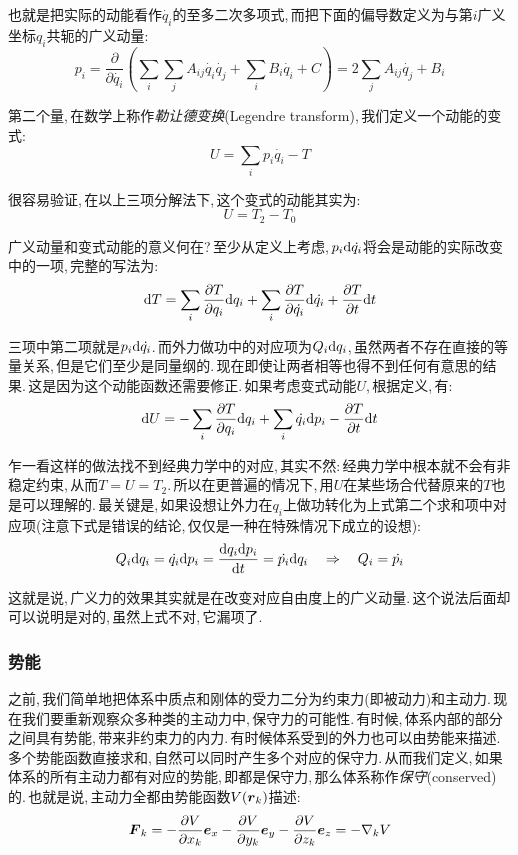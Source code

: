 也就是把实际的动能看作$\dot{q_i}$的至多二次多项式,\,而把下面的偏导数定义为与第$i$广义坐标$q_i$共轭的广义动量:
\[p_i=\frac{\partial}{\partial \dot{q_i}}\left(\sum_i\sum_j A_{ij}\dot{q_i}\dot{q_j}+\sum_i B_i \dot{q_i}+C\right)=2\sum_j A_{ij}\dot{q_j}+B_i\]

第二个量,\,在数学上称作\emph{勒让德变换}(Legendre transform),\,我们定义一个动能的变式:
\[U=\sum_i p_i\dot{q_i}-T\]

很容易验证,\,在以上三项分解法下,\,这个变式的动能其实为:
\[U=T_2-T_0\]

广义动量和变式动能的意义何在?\,至少从定义上考虑,\,$p_i\textrm{d} \dot{q_i}$将会是动能的实际改变中的一项,\,完整的写法为:
\[\textrm{d} T=\sum_i \frac{\partial T}{\partial q_i}\textrm{d} q_i+\sum_i \frac{\partial T}{\partial \dot{q_i}}\textrm{d} \dot{q_i}+\frac{\partial T}{\partial t}\textrm{d} t\]

三项中第二项就是$p_i\textrm{d} \dot{q_i}$.\,而外力做功中的对应项为$Q_i\textrm{d} q_i$,\,虽然两者不存在直接的等量关系,\,但是它们至少是同量纲的.\,现在即使让两者相等也得不到任何有意思的结果.\,这是因为这个动能函数还需要修正.\,如果考虑变式动能$U$,\,根据定义,\,有:
\[\textrm{d} U=-\sum_i \frac{\partial T}{\partial q_i}\textrm{d} q_i+\sum_i \dot{q_i}\textrm{d} p_i-\frac{\partial T}{\partial t}\textrm{d} t\]

乍一看这样的做法找不到经典力学中的对应,\,其实不然:\,经典力学中根本就不会有非稳定约束,\,从而$T=U=T_2$.\,所以在更普遍的情况下,\,用$U$在某些场合代替原来的$T$也是可以理解的.\,最关键是,\,如果设想让外力在$q_i$上做功转化为上式第二个求和项中对应项(注意下式是错误的结论,\,仅仅是一种在特殊情况下成立的设想):
\[Q_i\textrm{d} q_i=\dot{q_i}\textrm{d} p_i=\frac{\textrm{d} q_i \textrm{d} p_i}{\textrm{d} t}=\dot{p_i}\textrm{d} q_i\quad\Rightarrow\quad Q_i=\dot{p_i}\]

这就是说,\,广义力的效果其实就是在改变对应自由度上的广义动量.\,这个说法后面却可以说明是对的,\,虽然上式不对,\,它漏项了.

\subsubsection{势能}

之前,\,我们简单地把体系中质点和刚体的受力二分为约束力(即被动力)和主动力.\,现在我们要重新观察众多种类的主动力中,\,保守力的可能性.\,有时候,\,体系内部的部分之间具有势能,\,带来非约束力的内力.\,有时候体系受到的外力也可以由势能来描述.\,多个势能函数直接求和,\,自然可以同时产生多个对应的保守力.\,从而我们定义,\,如果体系的所有主动力都有对应的势能,\,即都是保守力,\,那么体系称作\emph{保守}(conserved)的.\,也就是说,\,主动力全都由势能函数$V(\boldsymbol{r}_k)$描述:
\[\boldsymbol{F}_k=-\frac{\partial V}{\partial x_k}\boldsymbol{e}_x-\frac{\partial V}{\partial y_k}\boldsymbol{e}_y-\frac{\partial V}{\partial z_k}\boldsymbol{e}_z=-\nabla_k V\]

